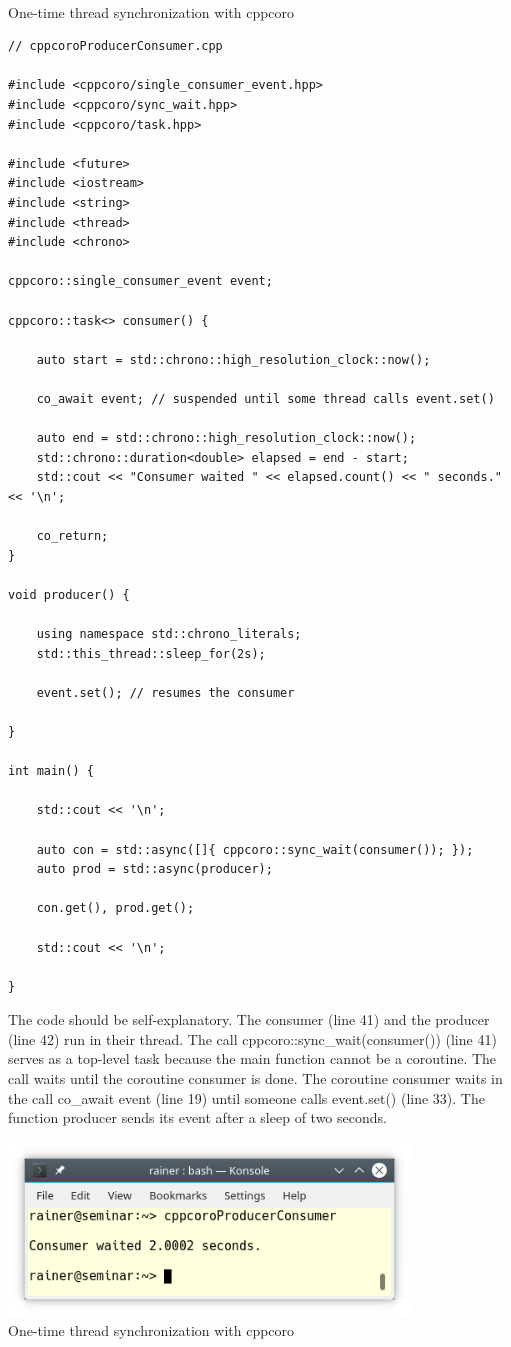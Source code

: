 \hspace*{\fill} \\ %
\noindent
One-time thread synchronization with cppcoro
\begin{lstlisting}[style=styleCXX]
// cppcoroProducerConsumer.cpp

#include <cppcoro/single_consumer_event.hpp>
#include <cppcoro/sync_wait.hpp>
#include <cppcoro/task.hpp>

#include <future>
#include <iostream>
#include <string>
#include <thread>
#include <chrono>

cppcoro::single_consumer_event event;

cppcoro::task<> consumer() {

	auto start = std::chrono::high_resolution_clock::now();
	
	co_await event; // suspended until some thread calls event.set()
	
	auto end = std::chrono::high_resolution_clock::now();
	std::chrono::duration<double> elapsed = end - start;
	std::cout << "Consumer waited " << elapsed.count() << " seconds." << '\n';
	
	co_return;
}

void producer() {

	using namespace std::chrono_literals;
	std::this_thread::sleep_for(2s);
	
	event.set(); // resumes the consumer

}

int main() {

	std::cout << '\n';
	
	auto con = std::async([]{ cppcoro::sync_wait(consumer()); });
	auto prod = std::async(producer);
	
	con.get(), prod.get();
	
	std::cout << '\n';

}
\end{lstlisting}

The code should be self-explanatory. The consumer (line 41) and the producer (line 42) run in their thread. The call cppcoro::sync\_wait(consumer()) (line 41) serves as a top-level task because the main function cannot be a coroutine. The call waits until the coroutine consumer is done. The coroutine consumer waits in the call co\_await event (line 19) until someone calls event.set() (line 33). The function producer sends its event after a sleep of two seconds.

\begin{center}
\includegraphics[width=0.8\textwidth]{content/5/chapter8/images/3.png}\\
One-time thread synchronization with cppcoro
\end{center}

